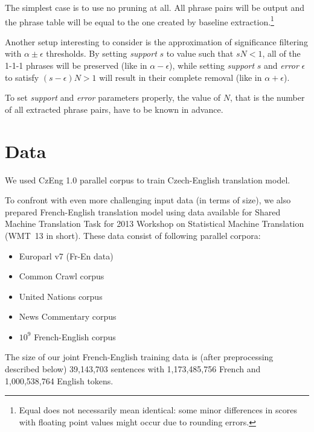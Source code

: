 The simplest case is to use no pruning at all. All phrase pairs will be
output and the phrase table will be equal to the one created by baseline
extraction.\footnote{Equal does not necessarily mean identical: some minor
differences in scores with floating point values might occur due to rounding
errors.}

Another setup interesting to consider is the approximation of significance
filtering with $\alpha \pm \epsilon$ thresholds.
By setting \emph{support} $s$ to value such that $sN < 1$, all of the 1-1-1
phrases will be preserved (like in $\alpha - \epsilon$), while setting
\emph{support} $s$ and \emph{error} $\epsilon$ to satisfy $(s - \epsilon)N > 1$
will result in their complete removal (like in $\alpha + \epsilon$).

To set \emph{support} and \emph{error} parameters properly, the value of $N$,
that is the number of all extracted phrase pairs, have to be known in advance.

\section{Data}

We used CzEng 1.0 parallel corpus \citep{czeng10:lrec2012} to train Czech-English
translation model.

To confront \eppex{} with even more challenging input data (in terms of size),
we also prepared French-English translation model using data available for
Shared Machine Translation Task for 2013 Workshop on Statistical Machine
Translation (WMT~13 in short).
These data consist of following parallel corpora:
\begin{itemize}
  \item Europarl v7 (Fr-En data)
  \item Common Crawl corpus
  \item United Nations corpus
  \item News Commentary corpus
  \item $10^9$ French-English corpus
\end{itemize}
The size of our joint French-English training data is (after preprocessing described
below) 39,143,703 sentences with 1,173,485,756 French and 1,000,538,764 English tokens.

